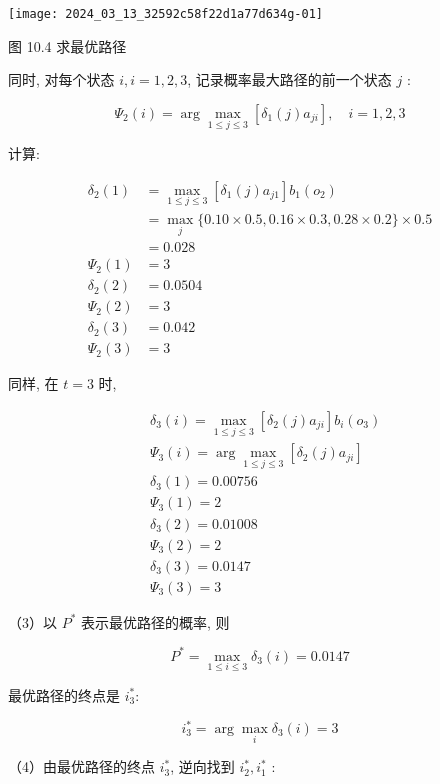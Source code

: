 \documentclass[10pt]{article}
\begin{document}
\begin{CJK*}{UTF8}{bsmi}
\begin{center}
\texttt{[image: 2024\_03\_13\_32592c58f22d1a77d634g-01]}
\end{center}

图 10.4 求最优路径

同时, 对每个状态 $i, i=1,2,3$, 记录概率最大路径的前一个状态 $j$ :

$$
\Psi_{2}(i)=\arg \max _{1 \leqslant j \leqslant 3}\left[\delta_{1}(j) a_{j i}\right], \quad i=1,2,3
$$

计算:

$$
\begin{aligned}
\delta_{2}(1) & =\max _{1 \leqslant j \leqslant 3}\left[\delta_{1}(j) a_{j 1}\right] b_{1}\left(o_{2}\right) \\
& =\max _{j}\{0.10 \times 0.5,0.16 \times 0.3,0.28 \times 0.2\} \times 0.5 \\
& =0.028 \\
\Psi_{2}(1) & =3 \\
\delta_{2}(2) & =0.0504 \\
\Psi_{2}(2) & =3 \\
\delta_{2}(3) & =0.042 \\
\Psi_{2}(3) & =3
\end{aligned}
$$

同样, 在 $t=3$ 时,

$$
\begin{aligned}
& \delta_{3}(i)=\max _{1 \leqslant j \leqslant 3}\left[\delta_{2}(j) a_{j i}\right] b_{i}\left(o_{3}\right) \\
& \Psi_{3}(i)=\arg \max _{1 \leqslant j \leqslant 3}\left[\delta_{2}(j) a_{j i}\right] \\
& \delta_{3}(1)=0.00756 \\
& \Psi_{3}(1)=2 \\
& \delta_{3}(2)=0.01008 \\
& \Psi_{3}(2)=2 \\
& \delta_{3}(3)=0.0147 \\
& \Psi_{3}(3)=3
\end{aligned}
$$

（3）以 $P^{*}$ 表示最优路径的概率, 则

$$
P^{*}=\max _{1 \leqslant i \leqslant 3} \delta_{3}(i)=0.0147
$$

最优路径的终点是 $i_{3}^{*}:$

$$
i_{3}^{*}=\arg \max _{i} \delta_{3}(i)=3
$$

（4）由最优路径的终点 $i_{3}^{*}$, 逆向找到 $i_{2}^{*}, i_{1}^{*}$ :


\end{CJK*}
\end{document}
